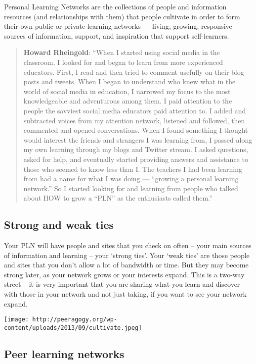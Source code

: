 Personal Learning Networks are the collections of people and information
resources (and relationships with them) that people cultivate in order
to form their own public or private learning networks --- living,
growing, responsive sources of information, support, and inspiration
that support self-learners.

\begin{quote}
\textbf{Howard Rheingold}: ``When I started using social media in the
classroom, I looked for and began to learn from more experienced
educators. First, I read and then tried to comment usefully on their
blog posts and tweets. When I began to understand who knew what in the
world of social media in education, I narrowed my focus to the most
knowledgeable and adventurous among them. I paid attention to the people
the savviest social media educators paid attention to. I added and
subtracted voices from my attention network, listened and followed, then
commented and opened conversations. When I found something I thought
would interest the friends and strangers I was learning from, I passed
along my own learning through my blogs and Twitter stream. I asked
questions, asked for help, and eventually started providing answers and
assistance to those who seemed to know less than I. The teachers I had
been learning from had a name for what I was doing --- ``growing a
personal learning network.'' So I started looking for and learning from
people who talked about HOW to grow a ``PLN'' as the enthusiasts called
them.''
\end{quote}

\subsection{Strong and weak ties}

Your PLN will have people and sites that you check on often -- your main
sources of information and learning -- your `strong ties'. Your `weak
ties' are those people and sites that you don't allow a lot of bandwidth
or time. But they may become strong later, as your network grows or your
interests expand. This is a two-way street -- it is very important that
you are sharing what you learn and discover with those in your network
and not just taking, if you want to see your network expand.

\texttt{[image: http://peeragogy.org/wp-content/uploads/2013/09/cultivate.jpeg]}

\subsection{Peer learning networks}

